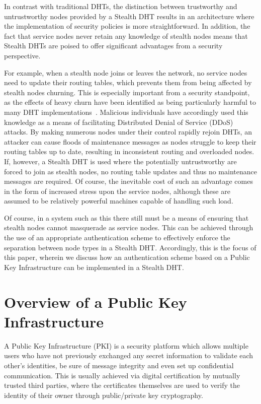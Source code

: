 \documentclass[pdftex,conference,10pt]{IEEEtran}
\begin{document}
In contrast with traditional DHTs, the distinction between trustworthy
and untrustworthy nodes provided by a Stealth DHT results in an
architecture where the implementation of security policies is more
straightforward. In addition, the fact that service nodes never retain
any knowledge of stealth nodes means that Stealth DHTs are poised to
offer significant advantages from a security perspective.

For example, when a stealth node joins or leaves the network, no
service nodes need to update their routing tables, which prevents them
from being affected by stealth nodes churning. This is especially
important from a security standpoint, as the effects of heavy churn
have been identified as being particularly harmful to many DHT
implementations~\cite{Rhea04Handling}\cite{Li04Comparing}. Malicious
individuals have accordingly used this knowledge as a means of
facilitating Distributed Denial of Service (DDoS) attacks. By making
numerous nodes under their control rapidly rejoin DHTs, an attacker can
cause floods of maintenance messages as nodes struggle to keep their
routing tables up to date, resulting in inconsistent routing and
overloaded nodes. If, however, a Stealth DHT is used where the
potentially untrustworthy are forced to join as stealth nodes, no
routing table updates and thus no maintenance messages are required. Of
course, the inevitable cost of such an advantage comes in the form of
increased stress upon the service nodes, although these are assumed to
be relatively powerful machines capable of handling such load.

Of course, in a system such as this there still must be a means of
ensuring that stealth nodes cannot masquerade as service nodes. This
can be achieved through the use of an appropriate authentication scheme
to effectively enforce the separation between node types in a Stealth
DHT. Accordingly, this is the focus of this paper, wherein we discuss
how an authentication scheme based on a Public Key Infrastructure can
be implemented in a Stealth DHT.

\section{Overview of a Public Key Infrastructure}
\label{sect-pkioverview}

A Public Key Infrastructure (PKI) is a security platform which allows
multiple users who have not previously exchanged any secret information
to validate each other's identities, be sure of message integrity and
even set up confidential communication. This is usually achieved via
digital certification by mutually trusted third parties, where the
certificates themselves are used to verify the identity of their owner
through public/private key cryptography.
\end{document}
